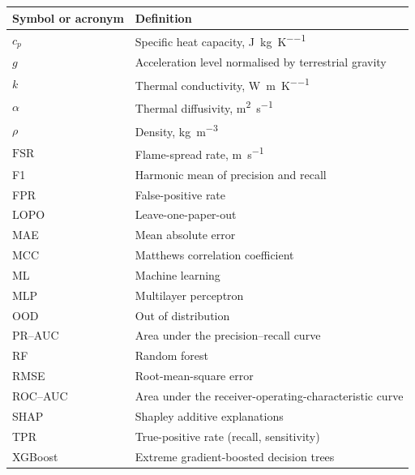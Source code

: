 \documentclass[10pt,a4paper,oneside]{report}
\newcommand{\FSR}{\ensuremath{\mathrm{FSR}}}
\begin{document}
\begin{longtable}{@{}p{}p{}@{}}
\toprule
Symbol or acronym & Definition\\
\midrule
\endhead
\(c_p\) & Specific heat capacity, \si{\joule\per\kilogram\per\kelvin}\\
\(g\) & Acceleration level normalised by terrestrial gravity\\
\(k\) & Thermal conductivity, \si{\watt\per\metre\per\kelvin}\\
\(\alpha\) & Thermal diffusivity, \si{\metre\squared\per\second}\\
\(\rho\) & Density, \si{\kilogram\per\metre\cubed}\\
\(\FSR\) & Flame-spread rate, \si{\metre\per\second}\\
F1 & Harmonic mean of precision and recall\\
FPR & False-positive rate\\
LOPO & Leave-one-paper-out\\
MAE & Mean absolute error\\
MCC & Matthews correlation coefficient\\
ML & Machine learning\\
MLP & Multilayer perceptron\\
OOD & Out of distribution\\
PR--AUC & Area under the precision--recall curve\\
RF & Random forest\\
RMSE & Root-mean-square error\\
ROC--AUC & Area under the receiver-operating-characteristic curve\\
SHAP & Shapley additive explanations\\
TPR & True-positive rate (recall, sensitivity)\\
XGBoost & Extreme gradient-boosted decision trees\\
\bottomrule
\end{longtable}

\clearpage
{}








\appendix


\clearpage


\end{document}
